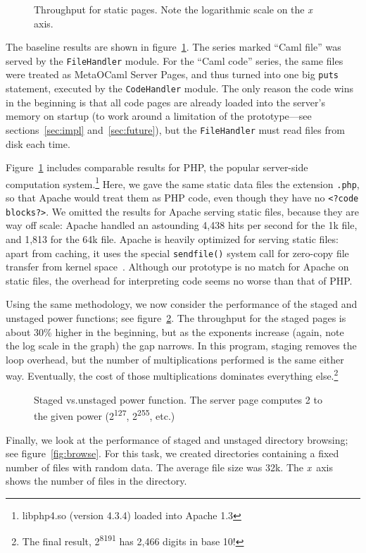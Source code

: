 \documentclass[preprint]{acm_proc_article-sp}
\def\MOC{MetaOCaml}
\newcommand{\myfig}[3]{%
  \begin{figure}[tbp]%
    #3%
    \caption{#2}%
    \label{fig:#1}%
  \end{figure}}
\newcommand{\gnuplot}[2]{%
  \myfig{#1}{#2}{}}
\begin{document}
\gnuplot{static}{Throughput for static pages.  Note the logarithmic
  scale on the \textit x axis.}

The baseline results are shown in figure~\ref{fig:static}.  The
series marked “Caml file” was served by the \texttt{FileHandler}
module.  For the “Caml code” series, the same files were treated
as \MOC{} Server Pages, and thus turned into one big
\texttt{puts} statement, executed by the \texttt{CodeHandler}
module.  The only reason the code wins in the beginning is that
all code pages are already loaded into the server’s memory on
startup (to work around a limitation of the prototype---see
sections~\ref{sec:impl} and~\ref{sec:future}), but the
\texttt{FileHandler} must read files from disk each time.

Figure~\ref{fig:static} includes comparable results for PHP, the
popular server-side computation system.\footnote{libphp4.so
  (version 4.3.4) loaded into Apache 1.3} Here, we gave the same
static data files the extension \texttt{.php}, so that Apache
would treat them as PHP code, even though they have no
\lstinline{<?code blocks?>}.
We omitted the results for Apache serving static files, because they
are way off scale: Apache handled an astounding 4,438 hits per second
for the 1k file, and 1,813 for the 64k file.  Apache is heavily
optimized for serving static files: apart from caching, it uses the
special \texttt{sendfile()} system call for zero-copy file transfer
from kernel space~\cite{tranter03sendfile}.  Although our prototype is
no match for Apache on static files, the overhead for interpreting
code seems no worse than that of PHP.

Using the same methodology, we now consider the performance of
the staged and unstaged power functions; see
figure~\ref{fig:power}.  The throughput for the staged pages is
about 30\% higher in the beginning, but as the exponents
increase (again, note the log scale in the graph) the gap
narrows.  In this program, staging removes the loop overhead,
but the number of multiplications performed is the same either
way.  Eventually, the cost of those multiplications dominates
everything else.\footnote{The final result,
  2\textsuperscript{8191} has 2,466 digits in base 10!}

\gnuplot{power}{Staged vs.\@ unstaged power function.  The
  server page computes 2 to the given power
  (2\textsuperscript{127}, 2\textsuperscript{255}, etc.)}

Finally, we look at the performance of staged and unstaged
directory browsing; see figure~\ref{fig:browse}.  For this task,
we created directories containing a fixed number of files with
random data.  The average file size was 32k.  The \emph{x}~axis
shows the number of files in the directory.  
\end{document}
